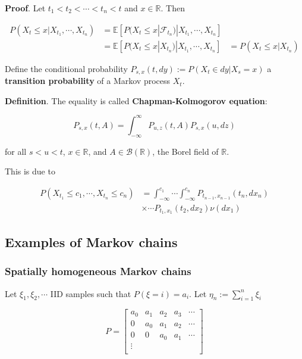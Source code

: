\documentclass[12pt]{article}
\theoremstyle{nonumberbreak}
\begin{document}
\textbf{Proof}. Let $t_1 < t_2 < \cdots < t_n < t$ and $x \in \mathbb{R}$. Then 

$$
\begin{aligned}
P(X_t \le x | X_{t_1}, \cdots, X_{t_n} ) &= \mathbb{E} \left[ P(X_t \le x | \mathcal{F}_{t_n}) | X_{t_1}, \cdots, X_{t_n} \right] \\[8pt]
&= \mathbb{E} \left[ P(X_t \le x | X_{t_n}) | X_{t_1}, \cdots, X_{t_n} \right]
&= P(X_t \le x | X_{t_n})
\end{aligned}
$$

Define the conditional probability $P_{s,x}(t, dy) := P(X_t \in dy | X_s = x)$ a \textbf{transition probability} of a Markov process $X_t$. 


\begin{theorem}
\textbf{Definition}. The equality is called \textbf{Chapman-Kolmogorov equation}:

$$
P_{s,x} (t,A) = \int_{-\infty}^\infty P_{u,z}(t,A) P_{s,x}(u,dz)
$$

for all $s < u < t$, $x \in \mathbb{R}$, and $A \in \mathcal{B}(\mathbb{R})$, the Borel field of $\mathbb{R}$. 

This is due to 

$$
\begin{aligned}
P(X_{t_1} \le c_1, \cdots, X_{t_n} \le c_n) &= \int_{-\infty}^{c_1} \cdots \int_{-\infty}^{c_n} P_{t_{n-1}, x_{n-1}} (t_n, dx_n) \\[8pt]
&\times \cdots P_{t_1, x_1} (t_2, dx_2) \nu(dx_1)
\end{aligned}
$$

\end{theorem}


\subsection{Examples of Markov chains}


\subsubsection*{Spatially homogeneous Markov chains}

Let $\xi_1, \xi_2, \cdots$ IID samples such that $P(\xi = i) = a_i$. Let $\eta_n := \sum_{i=1}^n \xi_i$

$$
P = \begin{bmatrix}
a_0 & a_1 & a_2 & a_3 & \cdots \\
0 & a_0 & a_1 & a_2 & \cdots \\
0 & 0 & a_0 & a_1 &  \cdots \\
\vdots & & & & \\
\end{bmatrix}
$$
\end{document}
